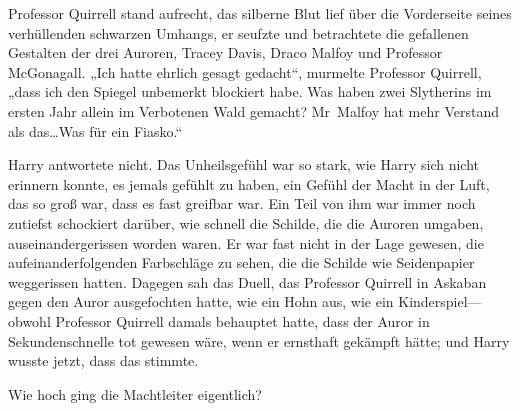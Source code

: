 Professor Quirrell stand aufrecht, das silberne Blut lief über die Vorderseite seines verhüllenden schwarzen Umhangs, er seufzte und betrachtete die gefallenen Gestalten der drei Auroren, Tracey Davis, Draco Malfoy und Professor McGonagall.
„Ich hatte ehrlich gesagt gedacht“, murmelte Professor Quirrell, „dass ich den Spiegel unbemerkt blockiert habe. Was haben zwei Slytherins im ersten Jahr allein im Verbotenen Wald gemacht? Mr~Malfoy hat mehr Verstand als das…Was für ein Fiasko.“

Harry antwortete nicht. Das Unheilsgefühl war so stark, wie Harry sich nicht erinnern konnte, es jemals gefühlt zu haben, ein Gefühl der Macht in der Luft, das so groß war, dass es fast greifbar war. Ein Teil von ihm war immer noch zutiefst schockiert darüber, wie schnell die Schilde, die die Auroren umgaben, auseinandergerissen worden waren. Er war fast nicht in der Lage gewesen, die aufeinanderfolgenden Farbschläge zu sehen, die die Schilde wie Seidenpapier weggerissen hatten. Dagegen sah das Duell, das Professor Quirrell in Askaban gegen den Auror ausgefochten hatte, wie ein Hohn aus, wie ein Kinderspiel—obwohl Professor Quirrell damals behauptet hatte, dass der Auror in Sekundenschnelle tot gewesen wäre, wenn er ernsthaft gekämpft hätte; und Harry wusste jetzt, dass das stimmte.

Wie hoch ging die Machtleiter eigentlich?

